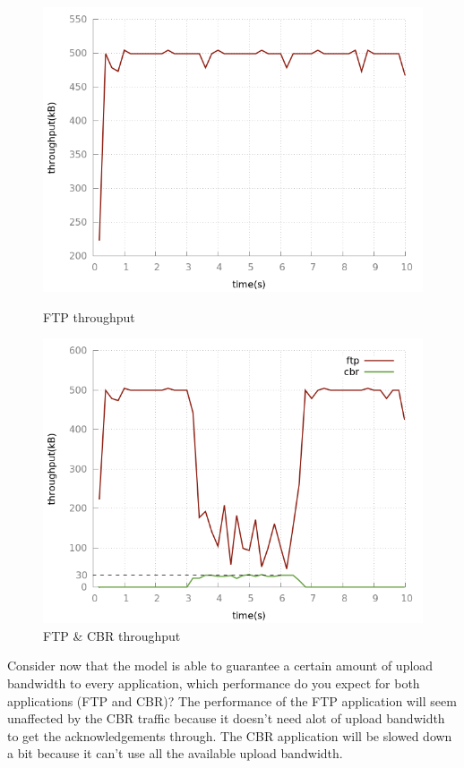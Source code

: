 \documentclass[9pt, a4paper, oneside]{article}
\makeatletter
\renewcommand\subsection{\@startsection{subsection}{2}{\z@}
    {-3.5ex \@plus -1ex \@minus -.2ex}
    {2.3ex \@plus.2ex}
    {\normalfont\normalsize\bfseries}}
\makeatother
\begin{document}
\begin{figure}[h]
\begin{minipage}[b]{0.45\linewidth}
\centering
\includegraphics[width=\textwidth]{ftp_throughput.png}
\caption{FTP throughput}
\label{ftp_throughput}
\end{minipage}
\begin{minipage}[b]{0.45\linewidth}
\centering
\includegraphics[width=\textwidth]{ftp_cbr_throughput.png}
\caption{FTP \& CBR throughput}
\label{ftp_cbr}
\end{minipage}
\end{figure}

\subsection{Consider now that the model is able to guarantee a certain amount
    of upload bandwidth to every application, which performance do you expect
    for both applications (FTP and CBR)?}
The performance of the FTP application will seem unaffected by the CBR traffic
because it doesn't need alot of upload bandwidth to get the acknowledgements
through.
The CBR application will be slowed down a bit because it can't use all the
available upload bandwidth.
\end{document}
